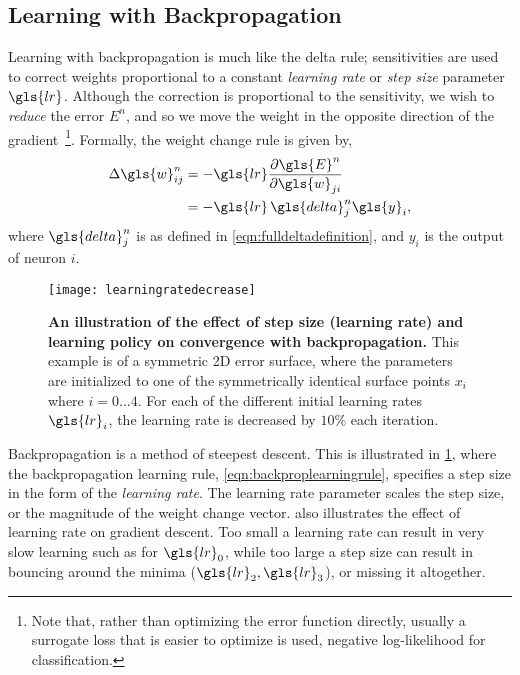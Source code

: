 \documentclass[thesis]{subfiles}
\begin{document}
\subsection{Learning with Backpropagation}
Learning with backpropagation is much like the delta rule; sensitivities are used to correct weights proportional to a constant \emph{learning rate} or \emph{step size} parameter $\gls{lr}$. Although the correction is proportional to the sensitivity, we wish to \emph{reduce} the error $E^n$, and so we move the weight in the opposite direction of the gradient~\footnote{Note that, rather than optimizing the error function directly, usually a surrogate loss that is easier to optimize is used, \eg negative log-likelihood for classification.}. Formally, the weight change rule is given by,
\begin{equation}
\begin{aligned}
    \Delta \gls{w}^n_{ij} &= -\gls{lr} \frac{\partial \gls{E}^n}{\partial \gls{w}_{ji}}\\
    &= -\gls{lr} \, \gls{delta}^n_j \gls{y}_i,
     \label{eqn:backproplearningrule}
\end{aligned}
\end{equation}
where $\gls{delta}^n_j$ is as defined in \cref{eqn:fulldeltadefinition}, and $y_i$ is the output of neuron $i$.
%
\begin{figure}[tbp]
\centering
\texttt{[image: learningratedecrease]}
\caption[Learning rate and convergence]{\textbf{An illustration of the effect of step size (learning rate) and learning policy on convergence with backpropagation.} This example is of a symmetric 2D error surface, where the parameters are initialized to one of the symmetrically identical surface points $x_i$ where $i=0\ldots4$. For each of the different initial learning rates $\gls{lr}_i$, the learning rate is decreased by $10\%$ each iteration.}\label{fig:learningrate}
\end{figure}
Backpropagation is a method of steepest descent. This is illustrated in \cref{fig:learningrate}, where the backpropagation learning rule, \cref{eqn:backproplearningrule}, specifies a step size in the form of the \emph{learning rate}. The learning rate parameter scales the step size, or the magnitude of the weight change vector.  also illustrates the effect of learning rate on gradient descent. Too small a learning rate can result in very slow learning such as for $\gls{lr}_0$, while too large a step size can result in bouncing around the minima ($\gls{lr}_2, \gls{lr}_3$), or missing it altogether. 
\end{document}
